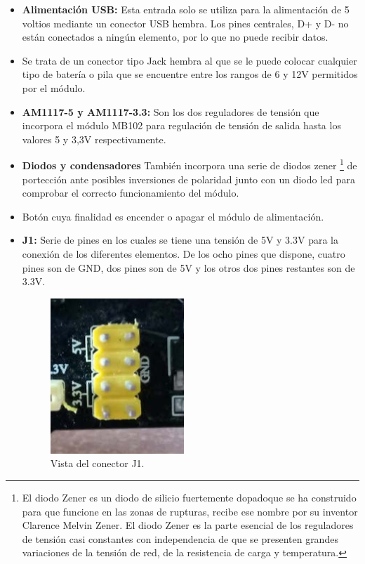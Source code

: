 \begin{itemize}
 \item \textbf{Alimentación USB:} Esta entrada solo se utiliza para la alimentación de 5 voltios mediante un conector USB hembra.
 Los pines centrales, D+ y D- no están conectados a ningún elemento, por lo que no puede recibir datos.

 \item {} Se trata de un conector tipo Jack hembra al que se le puede colocar cualquier tipo de batería
 o pila que se encuentre entre los rangos de 6 y 12V permitidos por el módulo.
 
 \item \textbf{AM1117-5 y AM1117-3.3:} Son los dos reguladores de tensión que incorpora el módulo MB102 para regulación de tensión de salida hasta los valores 
 5 y 3,3V respectivamente.
 
 \item \textbf{ Diodos y condensadores} También incorpora una serie de diodos zener \footnote{El diodo Zener es un diodo de silicio fuertemente dopado​ que se ha construido para que funcione en las zonas de rupturas, recibe ese nombre por su inventor Clarence Melvin Zener. El diodo Zener es la parte esencial de los reguladores de tensión casi constantes con independencia de que se presenten grandes variaciones de la tensión de red, de la resistencia de carga y temperatura. } 
 de portección ante posibles inversiones de polaridad junto con un diodo led para comprobar el correcto funcionamiento del módulo.
 
 \item {} Botón cuya finalidad es encender o apagar el módulo de alimentación.
 
 \item \textbf{J1:} Serie de pines en los cuales se tiene una tensión de 5V y 3.3V para la conexión de los diferentes elementos. De los ocho pines que dispone, cuatro pines son
 de GND, dos pines son de 5V y los otros dos pines restantes son de 3.3V.
 
 \begin{figure}[H]
  \begin{center}
    \includegraphics[scale=0.5]{imagenes/usb_board_pines.png}
  \end{center}
  \caption{Vista del conector J1.}
  \label{figura:conector_usb_board_j1}
\end{figure}


\end{itemize}
